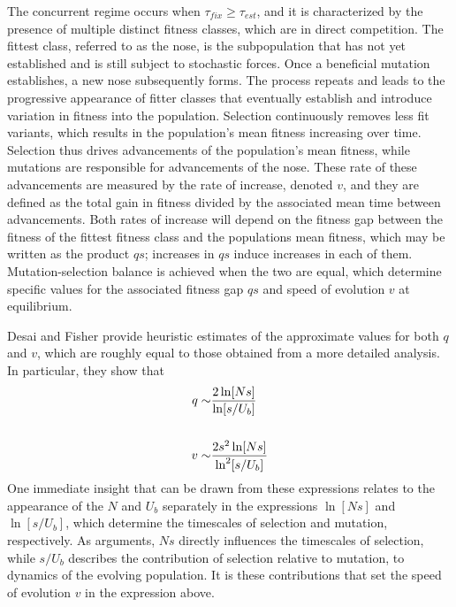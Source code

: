 \documentclass[12pt, one column]{article}
\begin{document}
The concurrent regime occurs when $\tau_{fix} \ge \tau_{est}$, and it is characterized by the presence of multiple distinct fitness classes, which are in direct competition.  The fittest class, referred to as the nose, is the subpopulation that has not yet established and is still subject to stochastic forces.  Once a beneficial mutation establishes, a new nose subsequently forms.  The process repeats and leads to the progressive appearance of fitter classes that eventually establish and introduce variation in fitness into the population.  Selection continuously removes less fit variants, which results in the population's mean fitness increasing over time.  Selection thus drives advancements of the population's mean fitness, while mutations are responsible for advancements of the nose.  These rate of these advancements are measured by the rate of increase, denoted $v$, and they are defined as the total gain in fitness divided by the associated mean time between advancements.  Both rates of increase will depend on the fitness gap between the fitness of the fittest fitness class and the populations mean fitness, which may be written as the product $qs$; increases in $qs$ induce increases in each of them.  Mutation-selection balance is achieved when the two are equal, which determine specific values for the associated fitness gap $qs$ and speed of evolution $v$ at equilibrium. 

Desai and Fisher provide heuristic estimates of the approximate values for both $q$ and $v$, which are roughly equal to those obtained from a more detailed analysis.  In particular, they show that
\begin{equation}
\begin{aligned}
q \sim & {2\ln[Ns] \over \ln[s/U_b]} \\   
\\
v \sim & {2s^2\ln[Ns] \over \ln^2[s/U_b]}
\end{aligned}
\end{equation}
One immediate insight that can be drawn from these expressions relates to the appearance of the $N$ and $U_b$ separately in the expressions $\ln[Ns]$ and $\ln[s/U_b]$, which determine the timescales of selection and mutation, respectively.  As arguments, $Ns$ directly influences the timescales of selection, while $s/U_b$ describes the contribution of selection relative to mutation, to dynamics of the evolving population.  It is these contributions that set the speed of evolution $v$ in the expression above.   
\end{document}
